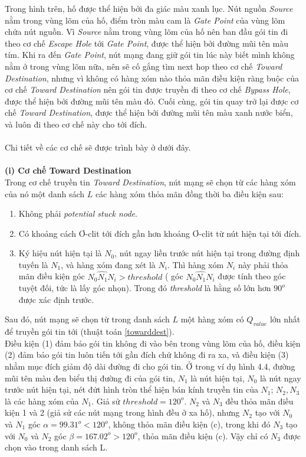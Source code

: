 \documentclass[12pt]{report}
\begin{document}
Trong hình trên, hố được thể hiện bởi đa giác màu xanh lục. Nút nguồn \textit{Source} nằm trong vùng lõm của hố, điểm tròn màu cam là \textit{Gate Point} của vùng lõm chứa nút nguồn. Vì \textit{Source} nằm trong vùng lõm của hố nên ban đầu gói tin đi theo cơ chế \textit{Escape Hole} tới \textit{Gate Point}, được thể hiện bởi đường mũi tên màu tím. Khi ra đến \textit{Gate Point}, nút mạng đang giữ gói tin lúc này biết mình không nằm ở trong vùng lõm nữa, nên sẽ cố gắng tìm next hop theo cơ chế \textit{Toward Destination}, nhưng vì không có hàng xóm nào thỏa mãn điều kiện ràng buộc của cơ chế \textit{Toward Destination} nên gói tin được truyền đi theo cơ chế \textit{Bypass Hole}, được thể hiện bởi đường mũi tên màu đỏ. Cuối cùng, gói tin quay trở lại được cơ chế \textit{Toward Destination}, được thể hiện bởi đường mũi tên màu xanh nước biển, và luôn đi theo cơ chế này cho tới đích.\\ \\
Chi tiết về các cơ chế sẽ được trình bày ở dưới đây.\\ \\
\textbf{(i) Cơ chế Toward Destination}\\
Trong cơ chế truyền tin \textit{Toward Destination}, nút mạng sẽ chọn từ các hàng xóm của nó một danh sách $ L $ các hàng xóm thỏa mãn đồng thời ba điều kiện sau:
\noindent
\begin{enumerate}
\item Không phải \textit{potential stuck node}.
\item Có khoảng cách Ơ-clit tới đích gần hơn khoảng Ơ-clit từ nút hiện tại tới đích.
\item Ký hiệu nút hiện tại là $N_{0}$, nút ngay liền trước nút hiện tại trong đường định tuyến là $N_{1}$, và hàng xóm đang xét là $N_{i}$. Thì hàng xóm $N_{i}$ này phải thỏa mãn điều kiện góc $ \widehat{N_{0}N_{1}N_{i}} > threshold $ ( góc $ \widehat{N_{0}N_{1}N_{i}}$ được tính theo góc tuyệt đối, tức là lấy góc nhọn). Trong đó \textit{threshold} là hằng số lớn hơn $90^{o}$ được xác định trước.
\end{enumerate}
Sau đó, nút mạng sẽ chọn từ trong danh sách $ L $ một hàng xóm có $Q_{value}$ lớn nhất để truyền gói tin tới (thuật toán \ref{towarddest}).\\
Điều kiện (1) đảm bảo gói tin không đi vào bên trong vùng lõm của hố, điều kiện (2) đảm bảo gói tin luôn tiến tới gần đích chứ không đi ra xa, và điều kiện (3) nhằm mục đích giảm độ dài đường đi cho gói tin. Ở trong ví dụ hình 4.4, đường mũi tên màu đen biểu thị đường đi của gói tin, $N_{1}$ là nút hiện tại, $ N_{0}$ là nút ngay trước nút hiện tại, nét đứt hình tròn thể hiện bán kính truyền tin của $N_{1}$; $N_{2}, N_{3}$ là các hàng xóm của $N_{1}$. Giả sử $ threshold = 120^{o}$. $N_{2}$ và $N_{3}$ đều thỏa mãn điều kiện 1 và 2 (giả sử các nút mạng trong hình đều ở xa hố), nhưng $N_{2}$ tạo với $N_{0}$ và $N_{1}$ góc $ \alpha = 99.31^{o} < 120^{o}$, không thỏa mãn điều kiện (c), trong khi đó $N_{3}$ tạo với $N_{0}$ và $N_{2}$ góc $ \beta = 167.02^{o} > 120^{o}$, thỏa mãn điều kiện (c). Vậy chỉ có $N_{3}$ được chọn vào trong danh sách L.\\
\end{document}
